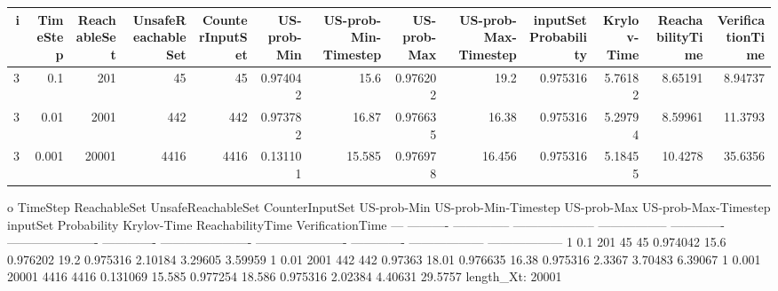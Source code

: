 \begin{tabular}{rrrrrrrrrrrrr}
\hline
   i &   TimeStep &   ReachableSet &   UnsafeReachableSet &   CounterInputSet &   US-prob-Min &   US-prob-Min-Timestep &   US-prob-Max &   US-prob-Max-Timestep &   inputSet Probability &   Krylov-Time &   ReachabilityTime &   VerificationTime \\
\hline
   3 &      0.1   &            201 &                   45 &                45 &      0.974042 &                 15.6   &      0.976202 &                 19.2   &               0.975316 &       5.76182 &            8.65191 &            8.94737 \\
   3 &      0.01  &           2001 &                  442 &               442 &      0.973782 &                 16.87  &      0.976635 &                 16.38  &               0.975316 &       5.29794 &            8.59961 &           11.3793  \\
   3 &      0.001 &          20001 &                 4416 &              4416 &      0.131101 &                 15.585 &      0.976978 &                 16.456 &               0.975316 &       5.18455 &           10.4278  &           35.6356  \\
\hline
\end{tabular}
o    TimeStep    ReachableSet    UnsafeReachableSet    CounterInputSet    US-prob-Min    US-prob-Min-Timestep    US-prob-Max    US-prob-Max-Timestep    inputSet Probability    Krylov-Time    ReachabilityTime    VerificationTime
---  ----------  --------------  --------------------  -----------------  -------------  ----------------------  -------------  ----------------------  ----------------------  -------------  ------------------  ------------------
  1       0.1               201                    45                 45       0.974042                  15.6         0.976202                  19.2                  0.975316        2.10184             3.29605             3.59959
  1       0.01             2001                   442                442       0.97363                   18.01        0.976635                  16.38                 0.975316        2.3367              3.70483             6.39067
  1       0.001           20001                  4416               4416       0.131069                  15.585       0.977254                  18.586                0.975316        2.02384             4.40631            29.5757
length_Xt: 20001

